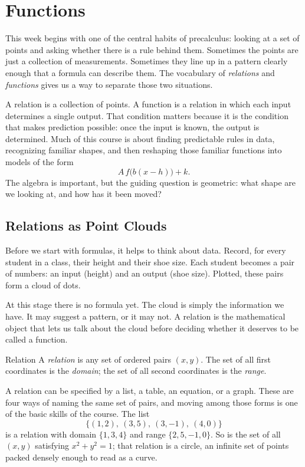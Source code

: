 \documentclass[12pt]{book}
\begin{document}
\chapter{Functions}

This week begins with one of the central habits of precalculus: looking at a set of
points and asking whether there is a rule behind them. Sometimes the points are just
a collection of measurements. Sometimes they line up in a pattern clearly enough that
a formula can describe them. The vocabulary of \emph{relations} and \emph{functions}
gives us a way to separate those two situations.

A relation is a collection of points. A function is a relation in which each input
determines a single output. That condition matters because it is the condition that
makes prediction possible: once the input is known, the output is determined. Much of
this course is about finding predictable rules in data, recognizing familiar shapes,
and then reshaping those familiar functions into models of the form
\[
  A\,f\!\big(b(x-h)\big)+k.
\]
The algebra is important, but the guiding question is geometric: what shape are we
looking at, and how has it been moved?

\section{Relations as Point Clouds}

Before we start with formulas, it helps to think about data. Record, for every
student in a class, their height and their shoe size. Each student becomes a pair of
numbers: an input (height) and an output (shoe size). Plotted, these pairs form a
cloud of dots.

At this stage there is no formula yet. The cloud is simply the information we have.
It may suggest a pattern, or it may not. A relation is the mathematical object that
lets us talk about the cloud before deciding whether it deserves to be called a
function.

\begin{definition}{Relation}
A \emph{relation} is any set of ordered pairs $(x,y)$. The set of all first
coordinates is the \emph{domain}; the set of all second coordinates is the
\emph{range}.
\end{definition}

A relation can be specified by a list, a table, an equation, or a graph. These are
four ways of naming the same set of pairs, and moving among those forms is one of the
basic skills of the course. The list
\[
\{(1,2),\ (3,5),\ (3,-1),\ (4,0)\}
\]
is a relation with domain $\{1,3,4\}$ and range $\{2,5,-1,0\}$. So is the set of all
$(x,y)$ satisfying $x^2+y^2=1$; that relation is a circle, an infinite set of points
packed densely enough to read as a curve.
\end{document}
